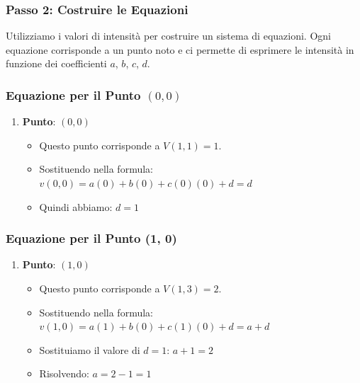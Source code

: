 \subsubsection{Passo 2: Costruire le
Equazioni}\label{passo-2-costruire-le-equazioni}

Utilizziamo i valori di intensità per costruire un sistema di equazioni.
Ogni equazione corrisponde a un punto noto e ci permette di esprimere le
intensità in funzione dei coefficienti \(a\), \(b\), \(c\), \(d\).

\subsubsection{\texorpdfstring{Equazione per il Punto
\((0, 0)\)}{Equazione per il Punto (0, 0)}}\label{equazione-per-il-punto-0-0}

\begin{enumerate}
\def\labelenumi{\arabic{enumi}.}
\tightlist
\item
  \textbf{Punto}: \((0, 0)\)

  \begin{itemize}
  \tightlist
  \item
    Questo punto corrisponde a \(V(1, 1) = 1\).
  \item
    Sostituendo nella formula:
    \(v(0, 0) = a(0) + b(0) + c(0)(0) + d = d\)
  \item
    Quindi abbiamo: \(d = 1\)
  \end{itemize}
\end{enumerate}

\subsubsection{Equazione per il Punto (1,
0)}\label{equazione-per-il-punto-1-0}

\begin{enumerate}
\def\labelenumi{\arabic{enumi}.}
\tightlist
\item
  \textbf{Punto}: \((1, 0)\)

  \begin{itemize}
  \tightlist
  \item
    Questo punto corrisponde a \(V(1, 3) = 2.\)
  \item
    Sostituendo nella formula:
    \(v(1, 0) = a(1) + b(0) + c(1)(0) + d = a + d\)
  \item
    Sostituiamo il valore di \(d = 1\): \(a + 1 = 2\)
  \item
    Risolvendo: \(a = 2 - 1 = 1\)
  \end{itemize}
\end{enumerate}

